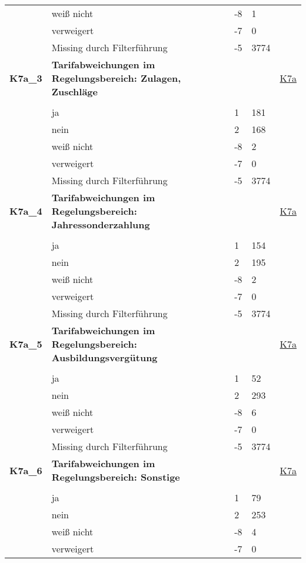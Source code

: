 \begin{longtable}{| L{2.5cm} | L{8.25cm}| C{1.5cm} | R{1.25cm} | C{2.25cm} |  }
   & weiß nicht & -8 & 1 &  \\ 
   & verweigert & -7 & 0 &  \\ 
   & Missing durch Filterführung & -5 & 3774 &  \\ 
   \midrule
\textbf{K7a\_3}\label{var:suf:K7a:3} & \textbf{Tarifabweichungen im Regelungsbereich: Zulagen, Zuschläge} &  &  & \hyperref[K7a]{K7a} \\ 
   &  &  &  &  \\ 
   & ja & 1 & 181 &  \\ 
   & nein & 2 & 168 &  \\ 
   & weiß nicht & -8 & 2 &  \\ 
   & verweigert & -7 & 0 &  \\ 
   & Missing durch Filterführung & -5 & 3774 &  \\ 
   \midrule
\textbf{K7a\_4}\label{var:suf:K7a:4} & \textbf{Tarifabweichungen im Regelungsbereich: Jahressonderzahlung} &  &  & \hyperref[K7a]{K7a} \\ 
   &  &  &  &  \\ 
   & ja & 1 & 154 &  \\ 
   & nein & 2 & 195 &  \\ 
   & weiß nicht & -8 & 2 &  \\ 
   & verweigert & -7 & 0 &  \\ 
   & Missing durch Filterführung & -5 & 3774 &  \\ 
   \midrule
\textbf{K7a\_5}\label{var:suf:K7a:5} & \textbf{Tarifabweichungen im Regelungsbereich: Ausbildungsvergütung} &  &  & \hyperref[K7a]{K7a} \\ 
   &  &  &  &  \\ 
   & ja & 1 & 52 &  \\ 
   & nein & 2 & 293 &  \\ 
   & weiß nicht & -8 & 6 &  \\ 
   & verweigert & -7 & 0 &  \\ 
   & Missing durch Filterführung & -5 & 3774 &  \\ 
   \midrule
\textbf{K7a\_6}\label{var:suf:K7a:6} & \textbf{Tarifabweichungen im Regelungsbereich: Sonstige} &  &  & \hyperref[K7a]{K7a} \\ 
   &  &  &  &  \\ 
   & ja & 1 & 79 &  \\ 
   & nein & 2 & 253 &  \\ 
   & weiß nicht & -8 & 4 &  \\ 
   & verweigert & -7 & 0 &  \\ 

\end{longtable}
